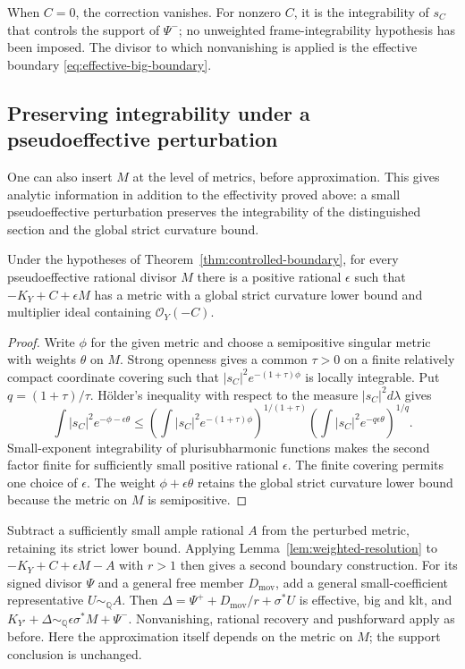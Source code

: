 When $C=0$, the correction vanishes.  For nonzero $C$, it is the
integrability of $s_C$ that controls the support of $\Psi^-$; no
unweighted frame-integrability hypothesis has been imposed.
The divisor to which nonvanishing is applied is the effective boundary
\eqref{eq:effective-big-boundary}.

\subsection{Preserving integrability under a pseudoeffective perturbation}

One can also insert $M$ at the level of metrics, before approximation.
This gives analytic information in addition to the effectivity proved
above: a small pseudoeffective perturbation preserves the integrability
of the distinguished section and the global strict curvature bound.

\begin{lemma}\label{lem:weighted-pseudoeffective-perturbation}
Under the hypotheses of Theorem~\ref{thm:controlled-boundary}, for
every pseudoeffective rational divisor $M$ there is a positive rational
$\epsilon$ such that $-K_Y+C+\epsilon M$ has a metric with a global
strict curvature lower bound and multiplier ideal containing
$\mathcal O_Y(-C)$.
\end{lemma}
\begin{proof}
Write $\phi$ for the given metric and choose a semipositive singular
metric with weights $\theta$ on $M$.  Strong openness
\cite{GuanZhou2015} gives a common $\tau>0$ on a finite relatively
compact coordinate covering such that
$|s_C|^2e^{-(1+\tau)\phi}$ is locally integrable.  Put
$q=(1+\tau)/\tau$.  H\"older's inequality with respect to the measure
$|s_C|^2d\lambda$ gives
\[
 \int |s_C|^2e^{-\phi-\epsilon\theta}
 \le
 \left(\int |s_C|^2e^{-(1+\tau)\phi}\right)^{1/(1+\tau)}
 \left(\int |s_C|^2e^{-q\epsilon\theta}\right)^{1/q}.
\]
Small-exponent integrability of plurisubharmonic functions
\cite{Skoda1972} makes the second factor finite for sufficiently small
positive rational $\epsilon$.  The finite covering permits one choice
of $\epsilon$.  The weight $\phi+\epsilon\theta$ retains the global
strict curvature lower bound because the metric on $M$ is semipositive.
\end{proof}

Subtract a sufficiently small ample rational $A$ from the perturbed
metric, retaining its strict lower bound.  Applying
Lemma~\ref{lem:weighted-resolution} to $-K_Y+C+\epsilon M-A$ with
$r>1$ then gives a second boundary construction.
For its signed divisor $\Psi$ and a general free member
$D_{\mathrm{mov}}$, add a general small-coefficient representative
$U\sim_{\mathbb Q}A$.  Then
$\Delta=\Psi^++D_{\mathrm{mov}}/r+\sigma^*U$ is effective, big and klt,
and $K_{Y'}+\Delta\sim_{\mathbb Q}\epsilon\sigma^*M+\Psi^-$.
Nonvanishing, rational recovery and pushforward apply as before.
Here the approximation itself depends on the metric on $M$;
the support conclusion is unchanged.
